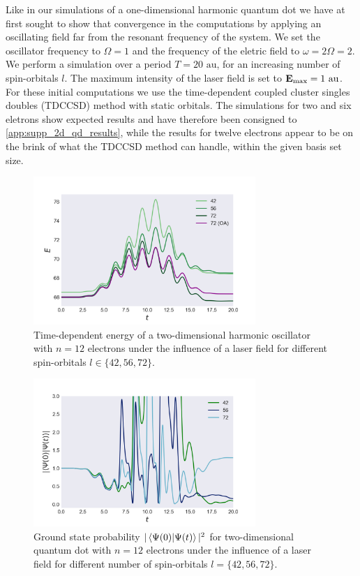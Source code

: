 Like in our simulations of a one-dimensional harmonic quantum dot we have at first 
sought to show that convergence in the computations by applying an oscillating 
field far from the resonant frequency of the system. We set the oscillator frequency 
to $\Omega=1$ and the frequency of the eletric field to $\omega=2\Omega=2$. We 
perform a simulation over a period $T = 20 \text{ au}$, for an increasing 
number of spin-orbitals $l$. The maximum intensity of the laser field is set to 
$\vb{E}_\text{max} = 1 \text{ au}$. For these initial computations we use the 
time-dependent coupled cluster singles doubles (TDCCSD) method with static 
orbitals. The simulations for two and six eletrons show expected results and have
therefore been consigned to \autoref{app:supp_2d_qd_results}, while the results for
twelve electrons appear to be on the brink of what the TDCCSD method 
can handle, within the given basis set size.

\begin{figure}
    \centering
    \includegraphics[width=0.75\textwidth]{results/figures/2D/n12_energy.png} 
    \caption{Time-dependent energy of a two-dimensional harmonic oscillator 
        with $n=12$ electrons under the influence of a laser field for different 
        spin-orbitals $l\in\{42,56,72\}$.
    }
    \label{fig:n12_2d_energy}
\end{figure}

\begin{figure}
    \centering
    \includegraphics[width=0.75\textwidth]{results/figures/2D/n12_overlap.png} 
    \caption{Ground state probability $|\braket{\Psi(0)}{\Psi(t)}|^2$ for two-dimensional
        quantum dot with $n=12$ electrons under the influence of a laser field for 
        different number of spin-orbitals $l=\{42,56,72\}$. 
    }
    \label{fig:n12_2d_overlap}
\end{figure}

